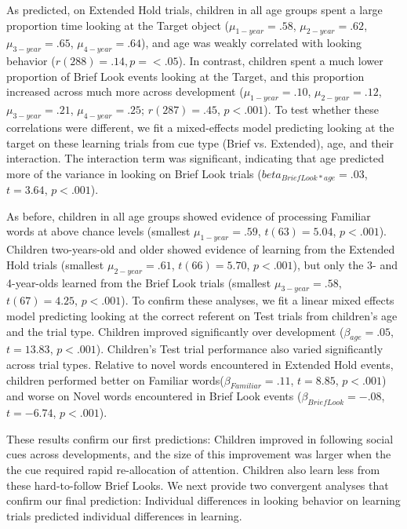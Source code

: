 \documentclass{pnastwo}
\begin{document}
\begin{article}
As predicted, on Extended Hold trials, children in all age groups spent a large proportion time looking at the Target object ($\mu_{1-year} = .58$, $\mu_{2-year} = .62$, $\mu_{3-year} = .65$, $\mu_{4-year} = .64$), and age was weakly correlated with looking behavior ($r(288) = .14, p = <.05$). In contrast, children spent a much lower proportion of Brief Look events looking at the Target, and this proportion increased across much more across development ($\mu_{1-year} = .10$, $\mu_{2-year} = .12$, $\mu_{3-year} = .21$, $\mu_{4-year} = .25$; $r(287) = .45$, $p < .001$). To test whether these correlations were different, we fit a mixed-effects model predicting looking at the target on these learning trials from cue type (Brief vs. Extended), age, and their interaction. The interaction term was significant, indicating that age predicted more of the variance in looking on Brief Look trials ($beta_{Brief Look * age} = .03$, $t = 3.64$, $p < . 001$).

As before, children in all age groups showed evidence of processing Familiar words at above chance levels (smallest $\mu_{1-year} = .59$, $t(63) = 5.04$, $p < .001$). Children two-years-old and older showed evidence of learning from the Extended Hold trials (smallest $\mu_{2-year} = .61$, $t(66) = 5.70$, $p < .001$), but only the 3- and 4-year-olds learned from the Brief Look trials (smallest $\mu_{3-year} = .58$, $t(67) = 4.25$, $p < .001$). To confirm these analyses, we fit a linear mixed effects model predicting looking at the correct referent on Test trials from children's age and the trial type. Children improved significantly over development ($\beta_{age} = .05$, $t = 13.83$, $p < .001$). Children's Test trial performance also varied significantly across trial types. Relative to novel words encountered in Extended Hold events, children performed better on Familiar words($\beta_{Familiar} = .11$, $t = 8.85$, $p < .001$) and worse on Novel words encountered in Brief Look events ($\beta_{Brief Look} = -.08$, $t = -6.74$, $p < .001$).

These results confirm our first predictions: Children improved in following social cues across developments, and the size of this improvement was larger when the the cue required rapid re-allocation of attention. Children also learn less from these hard-to-follow Brief Looks. We next provide two convergent analyses that confirm our final prediction: Individual differences in looking behavior on learning trials predicted individual differences in learning.


\end{article}
\end{document}
